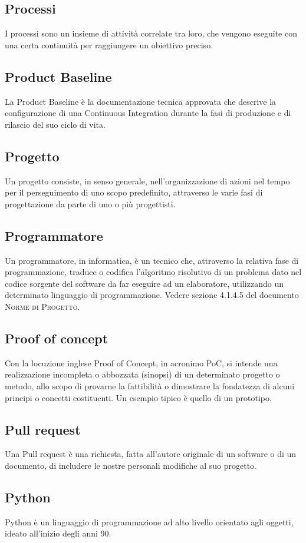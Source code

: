 \subsection*{Processi}
I processi sono un insieme di attività correlate tra loro, che vengono eseguite con una certa continuità per raggiungere un obiettivo preciso.

\subsection*{Product Baseline}
La Product Baseline è la documentazione tecnica approvata che descrive la configurazione di una Continuous Integration durante la fasi di produzione e di rilascio del suo ciclo di vita.

\subsection*{Progetto}
Un progetto consiste, in senso generale, nell'organizzazione di azioni nel tempo per il perseguimento di uno scopo predefinito, attraverso le varie fasi di progettazione da parte di uno o più progettisti.

\subsection*{Programmatore}
Un programmatore, in informatica, è un tecnico che, attraverso la relativa fase di programmazione, traduce o codifica l'algoritmo risolutivo di un problema dato nel codice sorgente del software da far eseguire ad un elaboratore, utilizzando un determinato linguaggio di programmazione. Vedere sezione 4.1.4.5 del documento \textsc{Norme di Progetto}.

\subsection*{Proof of concept}
Con la locuzione inglese Proof of Concept, in acronimo PoC, si intende una realizzazione incompleta o abbozzata (sinopsi) di un determinato progetto o metodo, allo scopo di provarne la fattibilità o dimostrare la fondatezza di alcuni principi o concetti costituenti. Un esempio tipico è quello di un prototipo.

\subsection*{Pull request}
Una Pull request è una richiesta, fatta all’autore originale di un software o di un documento, di includere le nostre personali modifiche al suo progetto.

\subsection*{Python}
Python è un linguaggio di programmazione ad alto livello orientato agli oggetti, ideato all'inizio degli anni 90.


